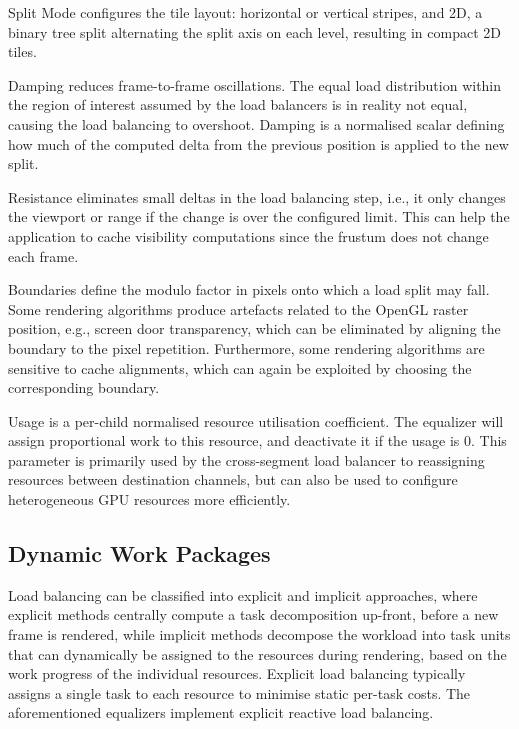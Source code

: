 \begin{compactdesc}
\item[Split Mode] configures the tile layout: horizontal or vertical stripes,
and 2D, a binary tree split alternating the split axis on each level, resulting
in compact 2D tiles.
\item[Damping] reduces frame-to-frame oscillations. The equal load distribution
within the region of interest assumed by the load balancers is in reality not
equal, causing the load balancing to overshoot. Damping is a normalised scalar
defining how much of the computed delta from the previous position is applied to
the new split.

\item[Resistance] eliminates small deltas in the load balancing step, i.e., it
only changes the viewport or range if the change is over the configured limit.
This can help the application to cache visibility computations since the
frustum does not change each frame.

\item[Boundaries] define the modulo factor in pixels onto which a load split may
fall. Some rendering algorithms produce artefacts related to the OpenGL raster
position, e.g., screen door transparency, which can be eliminated by aligning
the boundary to the pixel repetition. Furthermore, some rendering algorithms are
sensitive to cache alignments, which can again be exploited by choosing the
corresponding boundary.

\item[Usage] is a per-child normalised resource utilisation coefficient. The
equalizer will assign proportional work to this resource, and deactivate it if
the usage is 0. This parameter is primarily used by the cross-segment load
balancer to reassigning resources between destination channels, but can also be
used to configure heterogeneous GPU resources more efficiently.

\end{compactdesc}

\subsection{Dynamic Work Packages}

Load balancing can be classified into explicit and implicit approaches, where
explicit methods centrally compute a task decomposition up-front, before a new
frame is rendered, while implicit methods decompose the workload into task
units that can dynamically be assigned to the resources during rendering, based
on the work progress of the individual resources. Explicit load balancing
typically assigns a single task to each resource to minimise static per-task
costs. The aforementioned equalizers implement explicit reactive load
balancing.

